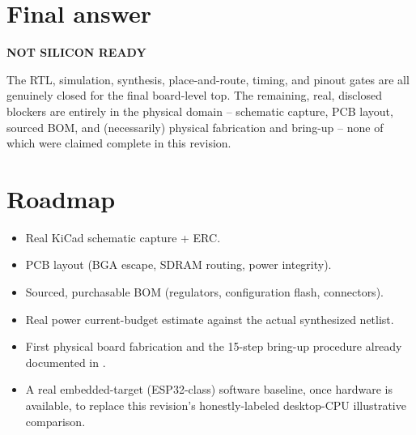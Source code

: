\section{Final answer}
\begin{center}
\Large\bfseries\color{fnRed}NOT SILICON READY
\end{center}
The RTL, simulation, synthesis, place-and-route, timing, and pinout
gates are all genuinely closed for the final board-level top. The
remaining, real, disclosed blockers are entirely in the physical
domain -- schematic capture, PCB layout, sourced BOM, and (necessarily)
physical fabrication and bring-up -- none of which were claimed
complete in this revision.

\section{Roadmap}
\begin{itemize}
\item Real KiCad schematic capture + ERC.
\item PCB layout (BGA escape, SDRAM routing, power integrity).
\item Sourced, purchasable BOM (regulators, configuration flash,
  connectors).
\item Real power current-budget estimate against the actual
  synthesized netlist.
\item First physical board fabrication and the 15-step bring-up
  procedure already documented in .
\item A real embedded-target (ESP32-class) software baseline, once
  hardware is available, to replace this revision's honestly-labeled
  desktop-CPU illustrative comparison.
\end{itemize}
